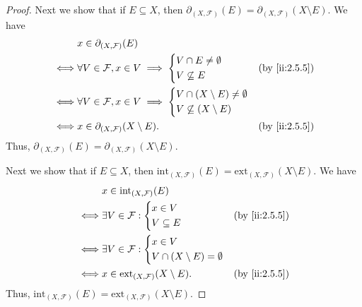 \begin{proof}
  Next we show that if \(E \subseteq X\), then \(\partial_{(X, \mathcal{F})}(E) = \partial_{(X, \mathcal{F})}(X \setminus E)\).
  We have
  \begin{align*}
         & x \in \partial_{(X, \mathcal{F})}(E)                                              \\
    \iff & \forall V \in \mathcal{F}, x \in V \implies \begin{dcases}
                                                         V \cap E \neq \emptyset \\
                                                         V \not\subseteq E
                                                       \end{dcases} &  & \by{ii:2.5.5}       \\
    \iff & \forall V \in \mathcal{F}, x \in V \implies \begin{dcases}
                                                         V \cap (X \setminus E) \neq \emptyset \\
                                                         V \not\subseteq (X \setminus E)
                                                       \end{dcases} \\
    \iff & x \in \partial_{(X, \mathcal{F})}(X \setminus E).          &  & \by{ii:2.5.5}
  \end{align*}
  Thus, \(\partial_{(X, \mathcal{F})}(E) = \partial_{(X, \mathcal{F})}(X \setminus E)\).

  Next we show that if \(E \subseteq X\), then \(\text{int}_{(X, \mathcal{F})}(E) = \text{ext}_{(X, \mathcal{F})}(X \setminus E)\).
  We have
  \begin{align*}
         & x \in \text{int}_{(X, \mathcal{F})}(E)                                 \\
    \iff & \exists V \in \mathcal{F} : \begin{dcases}
                                         x \in V \\
                                         V \subseteq E
                                       \end{dcases}          &  & \by{ii:2.5.5}   \\
    \iff & \exists V \in \mathcal{F} : \begin{dcases}
                                         x \in V \\
                                         V \cap (X \setminus E) = \emptyset
                                       \end{dcases}          \\
    \iff & x \in \text{ext}_{(X, \mathcal{F})}(X \setminus E). &  & \by{ii:2.5.5}
  \end{align*}
  Thus, \(\text{int}_{(X, \mathcal{F})}(E) = \text{ext}_{(X, \mathcal{F})}(X \setminus E)\).


\end{proof}
